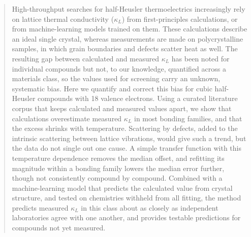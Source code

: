 %

\begin{abstract}
High-throughput searches for half-Heusler thermoelectrics increasingly rely on lattice thermal
conductivity ($\kappa_L$) from first-principles calculations, or from machine-learning models trained
on them. These calculations describe an ideal single crystal, whereas measurements are made on
polycrystalline samples, in which grain boundaries and defects scatter heat as well. The resulting gap
between calculated and measured $\kappa_L$ has been noted for individual compounds but not, to our
knowledge, quantified across a materials class, so the values used for screening carry an unknown, systematic bias. Here we
quantify and correct this bias for cubic half-Heusler compounds with 18 valence electrons. Using a curated literature corpus that
keeps calculated and measured values apart, we show that calculations overestimate measured $\kappa_L$
in most bonding families, and that the excess shrinks with temperature. Scattering by defects, added
to the intrinsic scattering between lattice vibrations, would give such a trend, but the data do not
single out one cause. A simple transfer function with this temperature dependence removes the median
offset, and refitting its magnitude within a bonding family lowers the median error further, though not
consistently compound by compound. Combined with a machine-learning model that predicts the calculated
value from crystal structure, and tested on chemistries withheld from all fitting, the method predicts
measured $\kappa_L$ in this class about as closely as independent laboratories agree with one another, and provides testable predictions
for compounds not yet measured.
\end{abstract}

